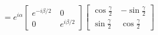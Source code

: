 \documentclass[preview]{standalone}
\begin{document}
\begin{align*}
= e^{i\alpha} \begin{bmatrix} e^{-i\beta/2}\
        & 0 \\[2mm] 0 & e^{i\beta/2} \end{bmatrix} \begin{bmatrix} \cos \frac{\gamma}{2}\
        & -\sin \frac{\gamma}{2} \\[2mm] \sin \frac{\gamma}{2} & \cos\frac{\gamma}{2} \end{bmatrix}
\end{align*}
\end{document}
